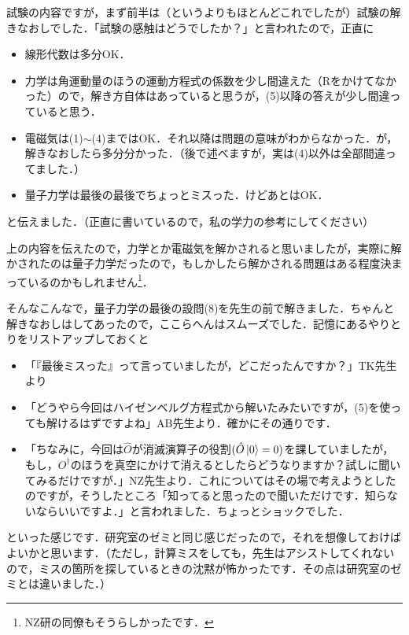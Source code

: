 \documentclass[a4paper,pdflatex,ja=standard]{bxjsarticle}
\begin{document}
試験の内容ですが，まず前半は（というよりもほとんどこれでしたが）試験の解きなおしでした．「試験の感触はどうでしたか？」と言われたので，正直に
\begin{itemize}
  \item 
  線形代数は多分OK．

  \item 
  力学は角運動量のほうの運動方程式の係数を少し間違えた（Rをかけてなかった）ので，解き方自体はあっていると思うが，(5)以降の答えが少し間違っていると思う．

  \item 
  電磁気は(1)$\sim$(4)まではOK．それ以降は問題の意味がわからなかった．が，解きなおしたら多分分かった．（後で述べますが，実は(4)以外は全部間違ってました．）
  
  \item 
  量子力学は最後の最後でちょっとミスった．けどあとはOK．
\end{itemize}
と伝えました．（正直に書いているので，私の学力の参考にしてください）

上の内容を伝えたので，力学とか電磁気を解かされると思いましたが，実際に解かされたのは量子力学だったので，もしかしたら解かされる問題はある程度決まっているのかもしれません\footnote{
  NZ研の同僚もそうらしかったです．
}．

そんなこんなで，量子力学の最後の設問(8)を先生の前で解きました．ちゃんと解きなおしはしてあったので，ここらへんはスムーズでした．記憶にあるやりとりをリストアップしておくと
\begin{itemize}
  \item 
  「『最後ミスった』って言っていましたが，どこだったんですか？」TK先生より
  
  \item 
  「どうやら今回はハイゼンベルグ方程式から解いたみたいですが，(5)を使っても解けるはずですよね」AB先生より．確かにその通りです．
  
  \item 
  「ちなみに，今回は$\hat{O}$が消滅演算子の役割$(\hat{O}\ket{0}=0)$を課していましたが，もし，$O^{\dag}$のほうを真空にかけて消えるとしたらどうなりますか？試しに聞いてみるだけですが．」NZ先生より．これについてはその場で考えようとしたのですが，そうしたところ「知ってると思ったので聞いただけです．知らないならいいですよ．」と言われました．ちょっとショックでした．
\end{itemize}    
といった感じです．研究室のゼミと同じ感じだったので，それを想像しておけばよいかと思います．（ただし，計算ミスをしても，先生はアシストしてくれないので，ミスの箇所を探しているときの沈黙が怖かったです．その点は研究室のゼミとは違いました．）
\end{document}
